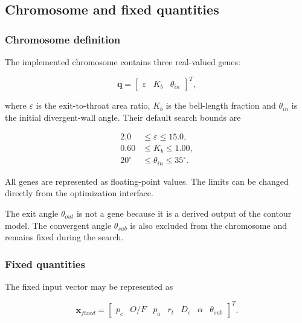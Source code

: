 \subsection{Chromosome and fixed quantities}

\subsubsection{Chromosome definition}

The implemented chromosome contains three real-valued genes:

\begin{equation}
\boxed{
\bm{q}
=
\begin{bmatrix}
\varepsilon & K_b & \theta_{in}
\end{bmatrix}^{T}
},
\label{eq:implemented_chromosome}
\end{equation}

where \(\varepsilon\) is the exit-to-throat area ratio, \(K_b\) is the bell-length
fraction and \(\theta_{in}\) is the initial divergent-wall angle. Their default search
bounds are

\begin{align}
2.0&\leq\varepsilon\leq15.0,
\label{eq:epsilon_gene_bounds}\\
0.60&\leq K_b\leq1.00,
\label{eq:bell_fraction_gene_bounds}\\
20^\circ&\leq\theta_{in}\leq35^\circ.
\label{eq:theta_in_gene_bounds}
\end{align}

All genes are represented as floating-point values. The limits can be changed directly
from the optimization interface.

The exit angle \(\theta_{out}\) is not a gene because it is a derived output of the
contour model. The convergent angle \(\theta_{sub}\) is also excluded from the
chromosome and remains fixed during the search.

\subsubsection{Fixed quantities}

The fixed input vector may be represented as

\begin{equation}
\bm{x}_{fixed}
=
\begin{bmatrix}
p_c & O/F & p_a & r_t & D_c & \alpha & \theta_{sub}
\end{bmatrix}^{T}.
\label{eq:ga_fixed_inputs}
\end{equation}


